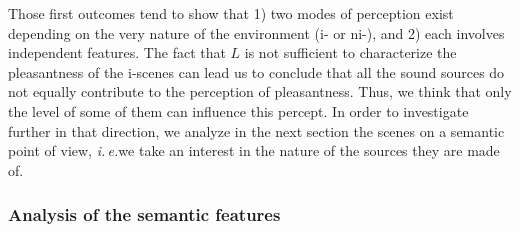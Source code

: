 \documentclass[12pt]{elsarticle}
\newcommand{\ie}{\emph{i.\,e.}}
\begin{document}
Those first outcomes tend to show that 1) two modes of perception exist depending on the very nature of the environment (i- or ni-), and 2) each involves independent features. The fact that $L$ is not sufficient to characterize the pleasantness of the i-scenes can lead us to conclude that all the sound sources do not equally contribute to the perception of pleasantness. Thus, we think that only the level of some of them can influence this percept. In order to investigate further in that direction, we analyze in the next section the scenes on a semantic point of view, \ie we take an interest in the nature of the sources they are made of.

\subsubsection*{Analysis of the semantic features}
\end{document}
